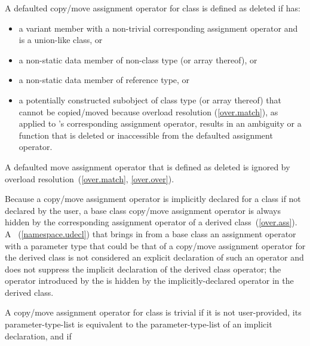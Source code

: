 \pnum
A defaulted copy/move assignment operator for
class  is defined as deleted if  has:
\begin{itemize}
\item a variant member with a non-trivial corresponding assignment operator and
   is a union-like class, or

\item a non-static data member of  non-class
  type (or array thereof), or

\item a non-static data member of reference type, or

\item a potentially constructed subobject of class type 
  (or array thereof) that cannot be copied/moved because overload resolution
  (\ref{over.match}), as applied to 's corresponding
  assignment operator, results in an ambiguity or
  a function that is deleted or inaccessible from the
  defaulted assignment operator.
\end{itemize}

A defaulted move assignment operator that is defined as deleted is ignored by
overload resolution~(\ref{over.match}, \ref{over.over}).

\pnum
{}%
%
Because a copy/move assignment operator is implicitly declared for a class
if not declared by the user,
a base class copy/move assignment operator is always hidden
by the corresponding assignment operator of a derived class~(\ref{over.ass}).
A
~(\ref{namespace.udecl}) that brings in from a base class an assignment operator
with a parameter type that could be that of a
copy/move assignment operator for the
derived class is not considered an explicit declaration of such an
operator and does not suppress the implicit declaration of the derived class
operator;
the operator introduced by the
is hidden by the implicitly-declared operator in the derived
class.

\pnum
{}%
%
A copy/move assignment operator for class
is
trivial
if it is not user-provided, its parameter-type-list is equivalent to the parameter-type-list
of an implicit declaration, and if


